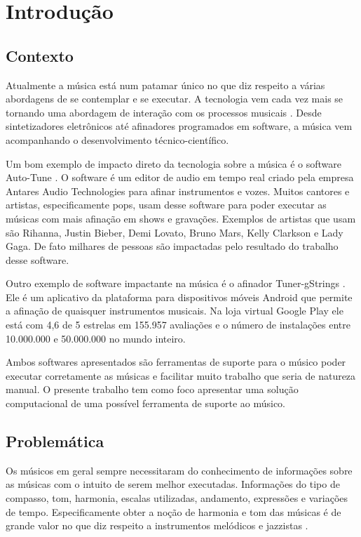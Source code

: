 \chapter[Introdução]{Introdução}
\label{chap:introducao}

\section{Contexto}
\label{sec:contexto}

Atualmente a música está num patamar único no que diz respeito a várias abordagens de se contemplar e se executar. A tecnologia vem cada vez mais se tornando uma abordagem de interação com os processos musicais \cite{makingmusictechnology}. Desde sintetizadores eletrônicos até afinadores programados em software, a música vem acompanhando o desenvolvimento técnico-científico.

Um bom exemplo de impacto direto da tecnologia sobre a música é o software Auto-Tune \cite{autotune}. O software é um editor de audio em tempo real criado pela empresa Antares Audio Technologies \cite{autotune2} para afinar instrumentos e vozes. Muitos cantores e artistas, especificamente pops, usam desse software para poder executar as músicas com mais afinação em shows e gravações. Exemplos de artistas que usam são Rihanna, Justin Bieber, Demi Lovato, Bruno Mars, Kelly Clarkson e Lady Gaga. De fato milhares de pessoas são impactadas pelo resultado do trabalho desse software.

Outro exemplo de software impactante na música é o afinador Tuner-gStrings \cite{afinador}. Ele é um aplicativo da plataforma para dispositivos móveis Android que permite a afinação de quaisquer instrumentos musicais. Na loja virtual Google Play ele está com 4,6 de 5 estrelas em 155.957 avaliações e o número de instalações entre 10.000.000 e 50.000.000 no mundo inteiro.

Ambos softwares apresentados são ferramentas de suporte para o músico poder executar corretamente as músicas e facilitar muito trabalho que seria de natureza manual. O presente trabalho tem como foco apresentar uma solução computacional de uma possível ferramenta de suporte ao músico.


\section{Problemática}
\label{sec:problematica}

Os músicos em geral sempre necessitaram do conhecimento de informações sobre as músicas com o intuito de serem melhor executadas. Informações do tipo de compasso, tom, harmonia, escalas utilizadas, andamento, expressões e variações de tempo. Especificamente obter a noção de harmonia e tom das músicas é de grande valor no que diz respeito a instrumentos melódicos e jazzistas \cite{jazzistas}. 

